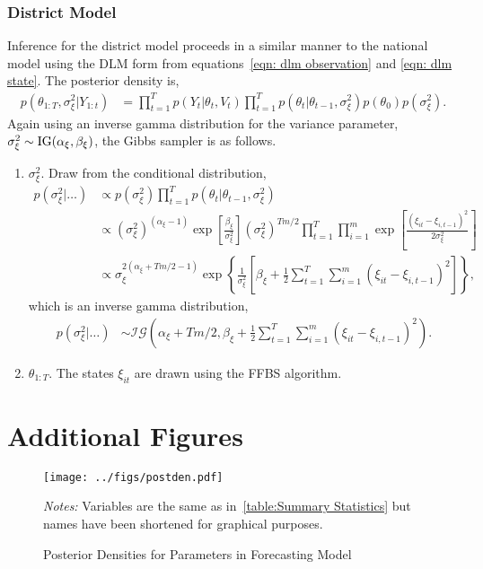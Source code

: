 \documentclass[12pt,final,fleqn]{article}
\theoremstyle{plain}
\begin{document}
\begin{appendices}
\subsubsection{District Model}
Inference for the district model proceeds in a similar manner to the national model using the DLM form from equations~\ref{eqn: dlm observation} and \ref{eqn: dlm state}. The posterior density is,
\begin{align}
p(\theta_{1:T}, \sigma^2_{\xi}|Y_{1:t}) &= \prod_{t=1}^T p(Y_t|\theta_t, V_t)\prod_{t=1}^T p(\theta_t|\theta_{t-1}, \sigma^2_\xi) p(\theta_0) p(\sigma^2_\xi).
\end{align}
Again using an inverse gamma distribution for the variance parameter, $\sigma^2_\xi \sim \rm{IG}(\alpha_\xi, \beta_\xi)$, the Gibbs sampler is as follows.
\begin{enumerate}
\item $\sigma_\xi^2$. Draw from the conditional distribution,
\begin{align}
p(\sigma_\xi^2|\ldots)&\propto p(\sigma_\xi^2) \prod_{t=1}^T p(\theta_{t}|\theta_{t-1}, \sigma_\xi^2) \\
&\propto (\sigma_\xi^2)^{(\alpha_\xi - 1)}\exp\left[\frac{\beta_\xi}{\sigma_\xi^2}\right](\sigma_\xi^2)^{Tm/2} \prod_{t=1}^T \prod_{i=1}^m \exp\left[\frac{(\xi_{it} - \xi_{i,t-1})^2}{2\sigma_\xi^2}\right]\\
&\propto \sigma_\xi^{2(\alpha_\xi + Tm/2 - 1)}\exp\left\{\frac{1}{\sigma_\xi^2}\left[\beta_\xi + \frac{1}{2}\sum_{t=1}^T \sum_{i=1}^m (\xi_{it} - \xi_{i,t-1})^2\right]\right\},
\end{align}
which is an inverse gamma distribution,
\begin{align}
p(\sigma_\xi^2|\ldots)&\sim \mathcal{IG}\left(\alpha_\xi + Tm/2, \beta_\xi + \frac{1}{2}\sum_{t=1}^T \sum_{i=1}^m (\xi_{it} - \xi_{i,t-1})^2  \right).
\end{align}
\item $\theta_{1:T}$. The states $\xi_{it}$ are drawn using the FFBS algorithm.
\end{enumerate}

\renewcommand\thefigure{\thesection.\arabic{figure}}    
\section{Additional Figures} \label{sec: Additional Figures 1}
\setcounter{figure}{0}  

\begin{landscape}
\begin{figure}[!ht]
\texttt{[image: ../figs/postden.pdf]}
\vspace{.5cm}
\caption{Posterior Densities for Parameters in Forecasting Model}
\label{fig:Posterior Densities for Parameters in Forecasting Model}
\begin{minipage}{\linewidth}
\footnotesize
\emph{Notes:} Variables are the same as in~\autoref{table:Summary Statistics} but names have been shortened for graphical purposes. 
\end{minipage}
\end{figure}
\end{landscape}


\end{appendices}
\end{document}
